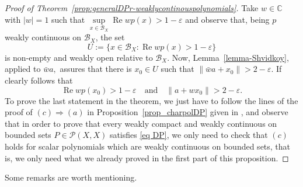 \documentclass[10pt]{amsart}
\def\CC{{\mathbb{C}}}
\DeclareMathOperator{\re}{Re}
\begin{document}
	\begin{proof}[Proof of Theorem~\ref{prop:generalDPr-weaklycontinouspolynomials}]
		Take $w\in \CC$ with $|w|=1$ such that $\sup\limits_{x\in \mathcal{B}_X} \re w p(x)>1-\varepsilon$ and observe that, being $p$ weakly continuous on $\mathcal{B}_X$, the set
		$$
		U:=\{x\in \mathcal{B}_X\colon \re w p(x)>1-\varepsilon\}
		$$
		is non-empty and weakly open relative to $\mathcal{B}_X$. Now, Lemma~\ref{lemma-Shvidkoy}, applied to $\bar{w}a,$ assures that there is $x_0\in U$ such that $\bigl\|\bar{w}a + x_0\bigr\|>2-\varepsilon$. If clearly follows that
		\begin{equation*}
			\re w p(x_0)>1-\varepsilon  \quad \text{and} \quad \|a+ w x_0\|>2-\varepsilon.
		\end{equation*}
		To prove the last statement in the theorem, we just have to follow the lines of the proof of $(c)\Rightarrow (a)$ in Proposition~\ref{prop_charpolDP} given in \cite[Theorem~1.1]{cgmm2}, and observe that in order to prove that every weakly compact and weakly continuous on bounded sets  $P\in \mathcal{P}(X,X)$ satisfies \eqref{eq DP}, we only need to check that $(c)$ holds for scalar polynomials which are weakly continuous on bounded sets, that is, we only need what we already proved in the first part of this proposition.
	\end{proof}
	
	Some remarks are worth mentioning.
	
\end{document}
